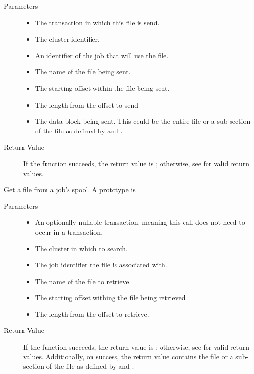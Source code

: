 \begin{description}
  \begin{description}
    \item[ Parameters]
    \begin{itemize}
      \item {} 
      The transaction in which this file is send.
      \item {} The cluster identifier.
      \item {}
      An identifier of the job that will use the file.
      \item {}
      The name of the file being sent.
      \item {} 
      The starting offset within the file being sent.
      \item {}
      The length from the offset to send.
      \item {}
      The data block being sent.  This could be the entire file or a
      sub-section of the file as defined by  and 
      .
    \end{itemize}
    \item[ Return Value]
      If the function succeeds, the return value is ; 
      otherwise, see  for valid return values. 
  \end{description}  

\item [\Code{getFile}]
  Get a file from a job's spool.
  A prototype is 


  \begin{description}
    \item[ Parameters]
    \begin{itemize}
      \item {} 
      An optionally nullable transaction, meaning this call does not 
      need to occur in a transaction. 
      \item {} The cluster in which to search.
      \item {}
      The job identifier the file is associated with.
      \item {}
      The name of the file to retrieve.
      \item {} 
      The starting offset withing the file being retrieved.
      \item {}
      The length from the offset to retrieve.
    \end{itemize}
    \item[ Return Value]
      If the function succeeds, the return value is ; 
      otherwise, see  for valid return values. Additionally,
      on success, the return value contains the file or a sub-section of the
      file as defined by  and .
  \end{description}  
  

\end{description}
